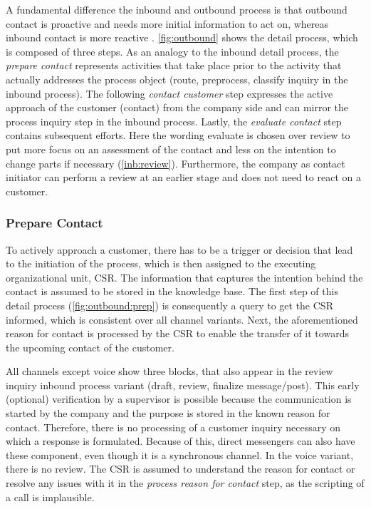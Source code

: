 	 
	 A fundamental difference the inbound and outbound process is that outbound contact is proactive and needs more initial information to act on, whereas inbound contact is more reactive \citep{DimensionData2015}. \Fig \ref{fig:outbound} shows the detail process, which is composed of three steps. As an analogy to the inbound detail process, the \textit{prepare contact} represents activities that take place prior to the activity that actually addresses the process object (route, preprocess, classify inquiry in the inbound process). The following \textit{contact customer} step expresses the active approach of the customer (contact) from the company side and can mirror the process inquiry step in the inbound process. Lastly, the \textit{evaluate contact} step contains subsequent efforts. Here the wording evaluate is chosen over review to put more focus on an assessment of the contact and less on the intention to change parts if necessary (\cf \ref{inb:review}). Furthermore, the company as contact initiator can perform a review at an earlier stage and does not need to react on a customer. 
	 
	 
	 \subsubsection{Prepare Contact}
	 
	 To actively approach a customer, there has to be a trigger or decision that lead to the initiation of the process, which is then assigned to the executing organizational unit, \ie \acrshort{CSR}. The information that captures the intention behind the contact is assumed to be stored in the knowledge base. The first step of this detail process (\Fig \ref{fig:outbound:prep}) is consequently a query to get the \acrshort{CSR} informed, which is consistent over all channel variants. Next, the aforementioned reason for contact is processed by the \acrshort{CSR} to enable the transfer of it towards the upcoming contact of the customer. 
	 
	 All channels except voice show three blocks, that also appear in the review inquiry inbound process variant (draft, review, finalize message/post). This early (optional) verification by a supervisor is possible because the communication is started by the company and the purpose is stored in the known reason for contact. Therefore, there is no processing of a customer inquiry necessary on which a response is formulated. Because of this, direct messengers can also have these component, even though it is a synchronous channel. In the voice variant, there is no review. The \acrshort{CSR} is assumed to understand the reason for contact or resolve any issues with it in the \textit{process reason for contact} step, as the scripting of a call is implausible. 
	 
